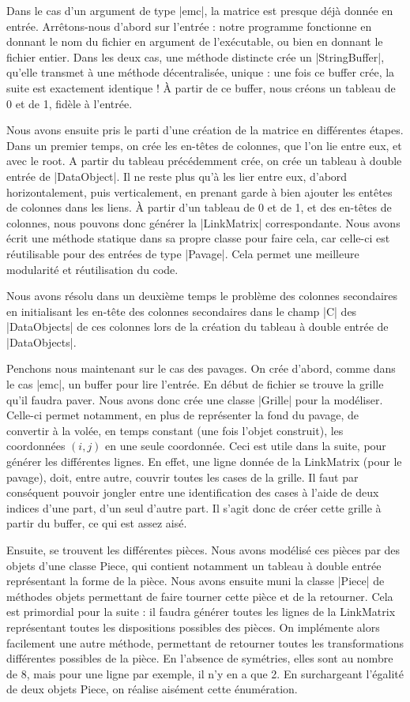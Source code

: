 \documentclass[11pt,french,a4paper]{article}
\begin{document}
Dans le cas d'un argument de type |emc|, la matrice est presque déjà donnée en entrée. Arrêtons-nous d'abord sur l'entrée : notre programme fonctionne en donnant le nom du fichier en argument de l'exécutable, ou bien en donnant le fichier entier. Dans les deux cas, une méthode distincte crée un |StringBuffer|, qu'elle transmet à une méthode décentralisée, unique : une fois ce buffer crée, la suite est exactement identique ! À partir de ce buffer, nous créons un tableau de 0 et de 1, fidèle à l'entrée. 

Nous avons ensuite pris le parti d'une création de la matrice en différentes étapes. Dans un premier temps, on crée les en-têtes de colonnes, que l'on lie entre eux, et avec le root. A partir du tableau précédemment crée, on crée un tableau à double entrée de |DataObject|. Il ne reste plus qu'à les lier entre eux, d'abord horizontalement, puis verticalement, en prenant garde à bien ajouter les entêtes de colonnes dans les liens. À partir d'un tableau de 0 et de 1, et des en-têtes de colonnes, nous pouvons donc générer la |LinkMatrix| correspondante. Nous avons écrit une méthode statique dans sa propre classe pour faire cela, car celle-ci est réutilisable pour des entrées de type |Pavage|. Cela permet une meilleure modularité et réutilisation du code.

Nous avons résolu dans un deuxième temps le problème des colonnes secondaires en initialisant les en-tête des colonnes secondaires dans le champ |C| des |DataObjects| de ces colonnes lors de la création du tableau à double entrée de |DataObjects|.

Penchons nous maintenant sur le cas des pavages. On crée d'abord, comme dans le cas |emc|, un buffer pour lire l'entrée. En début de fichier se trouve la grille qu'il faudra paver. Nous avons donc crée une classe |Grille| pour la modéliser. Celle-ci permet notamment, en plus de représenter la fond du pavage, de convertir à la volée, en temps constant (une fois l'objet construit), les coordonnées $(i,j)$ en une seule coordonnée. Ceci est utile dans la suite, pour générer les différentes lignes. En effet, une ligne donnée de la LinkMatrix (pour le pavage), doit, entre autre, couvrir toutes les cases de la grille. Il faut par conséquent pouvoir jongler entre une identification des cases à l'aide de deux indices d'une part, d'un seul d'autre part. Il s'agit donc de créer cette grille à partir du buffer, ce qui est assez aisé. 

Ensuite, se trouvent les différentes pièces. Nous avons modélisé ces pièces par des objets d'une classe Piece, qui contient notamment un tableau à double entrée représentant la forme de la pièce. Nous avons ensuite muni la classe |Piece| de méthodes objets permettant de faire tourner cette pièce et de la retourner. Cela est primordial pour la suite : il faudra générer toutes les lignes de la LinkMatrix représentant toutes les dispositions possibles des pièces. On implémente alors facilement une autre méthode, permettant de retourner toutes les transformations différentes possibles de la pièce. En l'absence de symétries, elles sont au nombre de 8, mais pour une ligne par exemple, il n'y en a que 2. En surchargeant l'égalité de deux objets Piece, on réalise aisément cette énumération.
\end{document}

